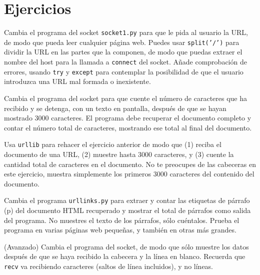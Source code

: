 \section{Ejercicios}

\begin{ex}
Cambia el programa del socket {\tt socket1.py} para que le pida al usuario
la URL, de modo que pueda leer cualquier página web.
Puedes usar {\tt split('/')} para dividir la URL en las partes que la componen,
de modo que puedas extraer el nombre del host para la llamada a {\tt connect} del socket.
Añade comprobación de errores, usando {\tt try} y {\tt except} para contemplar la posibilidad
de que el usuario introduzca una URL mal formada o inexistente.  
\end{ex}

\begin{ex}
Cambia el programa del socket para que cuente el número de caracteres que ha recibido
y se detenga, con un texto en pantalla, después de que se hayan mostrado 3000 caracteres. El programa
debe recuperar el documento completo y contar el número total de caracteres,
mostrando ese total al final del documento.
\end{ex}

\begin{ex}
Usa {\tt urllib} para rehacer el ejercicio anterior de modo que (1) reciba el documento
de una URL, (2) muestre hasta 3000 caracteres, y (3) cuente la cantidad total
de caracteres en el documento. No te preocupes de las cabeceras en este ejercicio,
muestra simplemente los primeros 3000 caracteres del contenido del documento.
\end{ex}

\begin{ex}
Cambia el programa {\tt urllinks.py} para extraer y contar
las etiquetas de párrafo (p) del documento HTML recuperado y
mostrar el total de párrafos como
salida del programa.
No muestres el texto de los párrafos, sólo cuéntalos.
Prueba el programa en varias páginas web pequeñas,
y también en otras más grandes.
\end{ex}

\begin{ex}
(Avanzado) Cambia el programa del socket, de modo que sólo muestre los datos
después de que se haya recibido la cabecera y la línea en blanco. Recuerda que {\tt recv}
va recibiendo caracteres (saltos de línea incluidos), y no líneas.
\end{ex}